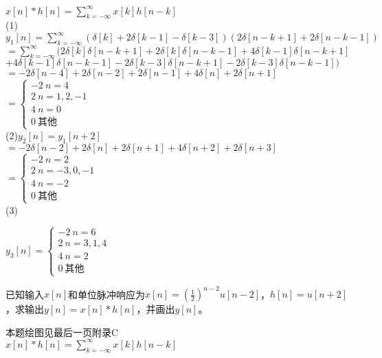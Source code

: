 \documentclass[answers]{exam}
\begin{document}
\begin{questions}
\begin{solution}
	$x[n]*h[n]=\sum_{k=-\infty}^{\infty}x[k]h[n-k]$\\

	(1)$y_1[n]=\sum_{k=-\infty}^{\infty}(\delta[k]+2\delta[k-1]-\delta[k-3])(2\delta[n-k+1]+2\delta[n-k-1])$\\
	
	$=\sum_{k=-\infty}^{\infty}(2\delta[k]\delta[n-k+1]+2\delta[k]\delta[n-k-1]+4\delta[k-1]\delta[n-k+1]$\\
	
	$+4\delta[k-1]\delta[n-k-1]-2\delta[k-3]\delta[n-k+1]-2\delta[k-3]\delta[n-k-1])$\\

	$=-2\delta[n-4]+2\delta[n-2]+2\delta[n-1]+4\delta[n]+2\delta[n+1]$\\

	$
=    \begin{cases}
        -2\ n=4\\
		2\ n=1,2,-1\\
		4\ n=0\\
		0\ \mbox{其他}
    \end{cases}
$\\

	(2)$y_2[n]=y_1[n+2]$\\

	$=-2\delta[n-2]+2\delta[n]+2\delta[n+1]+4\delta[n+2]+2\delta[n+3]$\\

	$
=    \begin{cases}
        -2\ n=2\\
		2\ n=-3,0,-1\\
		4\ n=-2\\
		0\ \mbox{其他}
    \end{cases}
$\\
	(3)

	$
y_3[n]=    \begin{cases}
        -2\ n=6\\
		2\ n=3,1,4\\
		4\ n=2\\
		0\ \mbox{其他}
    \end{cases}
$\\
\end{solution}



\question 已知输入$x[n]$和单位脉冲响应为$x[n]=\left(\frac{1}{2}\right)^{n-2}u[n-2]$，$h[n]=u[n+2]$，求输出$y[n]=x[n]\ast h[n]$，并画出$y[n]$。

\begin{solution}
	{\color{red} 本题绘图见最后一页附录C}\\
	$x[n]*h[n]=\sum_{k=-\infty}^{\infty}x[k]h[n-k]$\\


\end{solution}
\end{questions}
\end{document}
